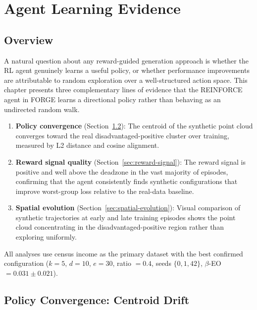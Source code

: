 \documentclass[12pt]{article}
\begin{document}

\section{Agent Learning Evidence}
\label{ch:agent-learning}

\subsection{Overview}

A natural question about any reward-guided generation approach is whether
the RL agent genuinely learns a useful policy, or whether performance
improvements are attributable to random exploration over a well-structured
action space.
This chapter presents three complementary lines of evidence that the
REINFORCE agent in FORGE learns a directional policy rather than behaving
as an undirected random walk.

\begin{enumerate}
  \item \textbf{Policy convergence} (Section~\ref{sec:centroid-drift}):
    The centroid of the synthetic point cloud converges toward the real
    disadvantaged-positive cluster over training, measured by L2 distance
    and cosine alignment.
  \item \textbf{Reward signal quality}
    (Section~\ref{sec:reward-signal}):
    The reward signal is positive and well above the deadzone in the
    vast majority of episodes, confirming that the agent consistently
    finds synthetic configurations that improve worst-group loss relative
    to the real-data baseline.
  \item \textbf{Spatial evolution}
    (Section~\ref{sec:spatial-evolution}):
    Visual comparison of synthetic trajectories at early and late
    training episodes shows the point cloud concentrating in the
    disadvantaged-positive region rather than exploring uniformly.
\end{enumerate}

All analyses use census income as the primary dataset with the best
confirmed configuration ($k=5$, $d=10$, $e=30$, ratio $= 0.4$, seeds
$\{0, 1, 42\}$, $\beta$-EO $= 0.031 \pm 0.021$).

\subsection{Policy Convergence: Centroid Drift}
\label{sec:centroid-drift}
\end{document}
